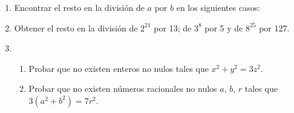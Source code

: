 \documentclass[a4paper,12pt,twoside,spanish,reqno]{amsbook}
\numberwithin{equation}{section}
\begin{document}
\begin{enumerate}
\item Encontrar el resto en la divisi\'on de $a$ por $b$ en los siguientes casos:


\item Obtener el resto en la divisi\'on de $2^{21}$ por 13; de $3^8$ por 5 y de  $8^{25}$ por 127.



%

\item \begin{enumerate}
\item Probar que no existen enteros no nulos tales que $x^2 + y^2 = 3z^2$.
\item Probar que no existen n\'umeros racionales no nulos $a$, $b$, $r$ tales que $3(a^2 + b^2) = 7r^2$.
\end{enumerate}




\end{enumerate}
\end{document}
